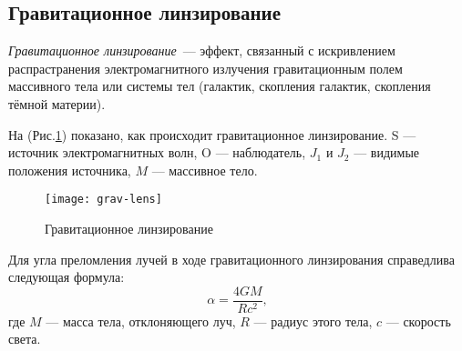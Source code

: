 \subsection{Гравитационное линзирование}

\textit{Гравитационное линзирование}~--- эффект, связанный с искривлением распрастранения электромагнитного излучения гравитационным полем массивного тела или системы тел (галактик, скопления галактик, скопления тёмной материи).

На (Рис.\ref{grav-lens}) показано, как происходит гравитационное линзирование. S --- источник электромагнитных волн, O --- наблюдатель, $J_1$ и $J_2$ --- видимые положения источника, $M$ --- массивное тело.

\begin{figure}[h!]
\begin{center}
\texttt{[image: grav-lens]}
\caption{Гравитационное линзирование}\label{grav-lens}
\end{center}
\end{figure}

Для угла преломления лучей в ходе гравитационного линзирования справедлива следующая формула:
\begin{equation}
\alpha=\frac{4GM}{Rc^2},
\end{equation}
где $M$ --- масса тела, отклоняющего луч, $R$ --- радиус этого тела, $c$ --- скорость света.